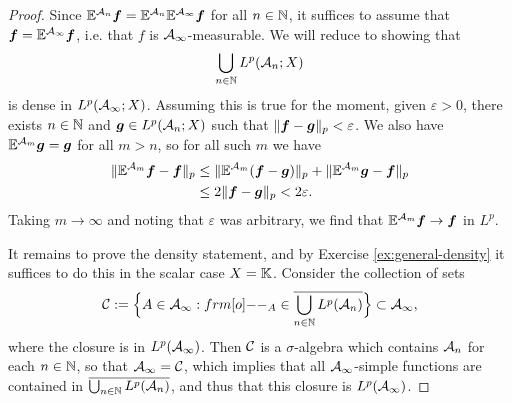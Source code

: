 \begin{proof}
  Since $\mathbb{E}^{\mathcal{A}_{n}} \bm{f} = \mathbb{E}^{\mathcal{A}_{n}} \mathbb{E}^{\mathcal{A}_{\infty}} \bm{f}$ for all $n \in \mathbb{N}$, it suffices to assume that $\bm{f} = \mathbb{E}^{\mathcal{A}_{\infty}} \bm{f}$, i.e. that $f$ is $\mathcal{A}_{\infty}$-measurable.
  We will reduce to showing that
  \begin{equation*}
    \bigcup_{n \in \mathbb{N}} L^p(\mathcal{A}_{n};X)
  \end{equation*}
  is dense in $L^p(\mathcal{A}_{\infty};X)$.
  Assuming this is true for the moment, given $\varepsilon > 0$, there exists $n \in \mathbb{N}$ and $\bm{g} \in L^p(\mathcal{A}_{n};X)$ such that $\|\bm{f} - \bm{g}\|_p < \varepsilon$.
  We also have $\mathbb{E}^{\mathcal{A}_{m}} \bm{g} = \bm{g}$ for all $m > n$, so for all such $m$ we have
  \begin{equation*}
    \begin{aligned}
      \|\mathbb{E}^{\mathcal{A}_{m}} \bm{f} - \bm{f}\|_p
      &\leq \|\mathbb{E}^{\mathcal{A}_m}(\bm{f} - \bm{g})\|_p + \|\mathbb{E}^{\mathcal{A}_{m}} \bm{g} - \bm{f}\|_p \\
      &\leq 2\|\bm{f} - \bm{g}\|_{p} < 2\varepsilon.
    \end{aligned}
  \end{equation*}
  Taking $m \to \infty$ and noting that $\varepsilon$ was arbitrary, we find that $\mathbb{E}^{\mathcal{A}_{m}} \bm{f} \to \bm{f}$ in $L^p$.

  It remains to prove the density statement, and by Exercise \ref{ex:general-density} it suffices to do this in the scalar case $X = \mathbb{K}$.
  Consider the collection of sets
  \begin{equation*}
    \mc{C} := \Big\{A \in \mc{A}_{\infty} : \1_{A} \in \overline{\bigcup_{n \in \N} L^p(\mc{A}_{n})} \Big\} \subset \mc{A}_{\infty},
  \end{equation*}
  where the closure is in $L^p(\mathcal{A}_{\infty})$.
  Then $\mathcal{C}$ is a $\sigma$-algebra which contains $\mathcal{A}_{n}$ for each $n \in \mathbb{N}$, so that $\mathcal{A}_{\infty} = \mathcal{C}$, which implies that all $\mathcal{A}_{\infty}$-simple functions are contained in $\overline{\bigcup_{n \in \mathbb{N}} L^p(\mathcal{A}_{n})}$, and thus that this closure is $L^p(\mathcal{A}_{\infty})$.  
\end{proof}

